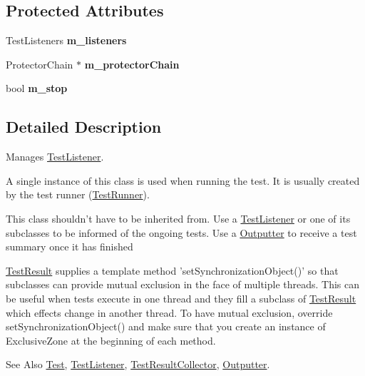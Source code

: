 \subsection*{Protected Attributes}
\begin{DoxyCompactItemize}
\item 
\hypertarget{class_test_result_a6e5daf8393ca6cdd5a9c3b44074b037b}{Test\-Listeners {\bfseries m\-\_\-listeners}}\label{class_test_result_a6e5daf8393ca6cdd5a9c3b44074b037b}

\item 
\hypertarget{class_test_result_abb4a702b14af262661a9e02a0193312f}{Protector\-Chain $\ast$ {\bfseries m\-\_\-protector\-Chain}}\label{class_test_result_abb4a702b14af262661a9e02a0193312f}

\item 
\hypertarget{class_test_result_ab8c04c2021b19f0c8d19bf4675f2bd86}{bool {\bfseries m\-\_\-stop}}\label{class_test_result_ab8c04c2021b19f0c8d19bf4675f2bd86}

\end{DoxyCompactItemize}


\subsection{Detailed Description}
Manages \hyperlink{class_test_listener}{Test\-Listener}.

A single instance of this class is used when running the test. It is usually created by the test runner (\hyperlink{class_test_runner}{Test\-Runner}). 

This class shouldn't have to be inherited from. Use a \hyperlink{class_test_listener}{Test\-Listener} or one of its subclasses to be informed of the ongoing tests. Use a \hyperlink{class_outputter}{Outputter} to receive a test summary once it has finished

\hyperlink{class_test_result}{Test\-Result} supplies a template method 'set\-Synchronization\-Object()' so that subclasses can provide mutual exclusion in the face of multiple threads. This can be useful when tests execute in one thread and they fill a subclass of \hyperlink{class_test_result}{Test\-Result} which effects change in another thread. To have mutual exclusion, override set\-Synchronization\-Object() and make sure that you create an instance of Exclusive\-Zone at the beginning of each method.

\begin{DoxySeeAlso}{See Also}
\hyperlink{class_test}{Test}, \hyperlink{class_test_listener}{Test\-Listener}, \hyperlink{class_test_result_collector}{Test\-Result\-Collector}, \hyperlink{class_outputter}{Outputter}. 
\end{DoxySeeAlso}


